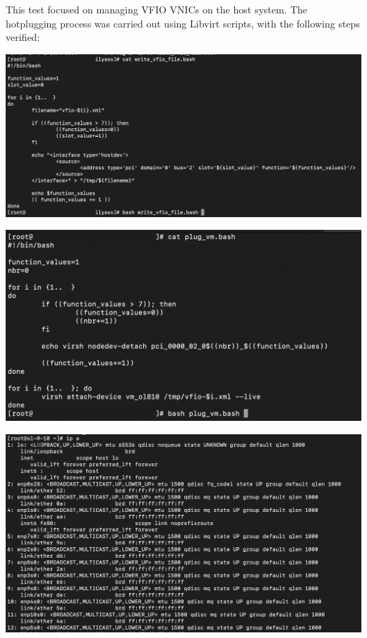This test focused on managing VFIO VNICs on the host system. The hotplugging process was carried out using Libvirt scripts, with the following steps verified:

\begin{center}
    \centering
    \includegraphics[width=\textwidth]{Images/Populate VFIO libvirt.png}
    \label{fig}
\end{center}

\begin{center}
    \centering
    \includegraphics[width=\textwidth]{Images/VFIO VNIC Hotplug Libvirt.png}
    \label{fig}
\end{center}

\begin{center}
    \centering
    \includegraphics[width=\textwidth]{Images/ip a after hotplug vfio libvirt.png}
    \label{fig}
\end{center}

